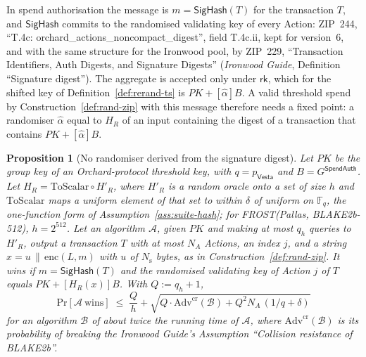 \documentclass[11pt,a4paper]{article}
\newtheorem{proposition}[theorem]{Proposition}
\theoremstyle{definition}
\newcommand{\F}{\mathbb{F}}
\renewcommand{\Pr}{\mathrm{Pr}}
\newcommand{\Fq}{\F_q}
\newcommand{\rk}{\mathsf{rk}}
\newcommand{\Vesta}{\ensuremath{\mathsf{Vesta}}}
\begin{document}
In spend authorisation the message is \(m = \mathsf{SigHash}(T)\) for the
transaction \(T\), and \(\mathsf{SigHash}\) commits to the randomised
validating key of every Action: ZIP~244, ``T.4c:
orchard\_actions\_noncompact\_digest'', field T.4c.ii, kept for version~6,
and with the same structure for the Ironwood pool, by ZIP~229,
``Transaction Identifiers, Auth Digests, and Signature Digests''
(\emph{Ironwood Guide}, Definition ``Signature digest''). The aggregate is
accepted only under \(\rk\), which for the shifted key of
Definition~\ref{def:rerand-ts} is \(\mathit{PK} + [\hat{\alpha}]B\). A
valid threshold spend by Construction~\ref{def:rand-zip} with this message
therefore needs a fixed point: a randomiser \(\hat{\alpha}\) equal to
\(H_R\) of an input containing the digest of a transaction that contains
\(\mathit{PK} + [\hat{\alpha}]B\).

\begin{proposition}[No randomiser derived from the signature digest]
\label{prop:circular}
Let \(\mathit{PK}\) be the group key of an Orchard-protocol threshold key,
with \(q = p_{\Vesta}\) and \(B = G^{\mathsf{SpendAuth}}\). Let
\(H_R = \mathrm{ToScalar} \circ H'_R\), where \(H'_R\) is a random oracle
onto a set of size \(h\) and \(\mathrm{ToScalar}\) maps a uniform element
of that set to within \(\delta\) of uniform on \(\Fq\), the one-function
form of Assumption~\ref{ass:suite-hash}; for FROST(Pallas, BLAKE2b-512),
\(h = 2^{512}\). Let an algorithm \(\mathcal{A}\), given \(\mathit{PK}\) and
making at most \(q_h\) queries to \(H'_R\), output a transaction \(T\) with
at most \(N_A\) Actions, an index \(j\), and a string
\(x = u \,\|\, \mathrm{enc}(L, m)\) with \(u\) of \(N_{\mathrm{s}}\) bytes,
as in Construction~\ref{def:rand-zip}. It \emph{wins} if
\(m = \mathsf{SigHash}(T)\) and the randomised validating key of Action
\(j\) of \(T\) equals \(\mathit{PK} + [H_R(x)]B\). With
\(Q := q_h + 1\),
\[
  \Pr[\mathcal{A}\ \text{wins}] \;\le\; \frac{Q}{h}
    + \sqrt{Q \cdot \mathrm{Adv}^{\mathrm{cr}}(\mathcal{B})
      + Q^{2} N_A \,(1/q + \delta)}
\]
for an algorithm \(\mathcal{B}\) of about twice the running time of
\(\mathcal{A}\), where \(\mathrm{Adv}^{\mathrm{cr}}(\mathcal{B})\) is its
probability of breaking the \emph{Ironwood Guide}'s Assumption ``Collision
resistance of BLAKE2b''.
\end{proposition}
\end{document}
